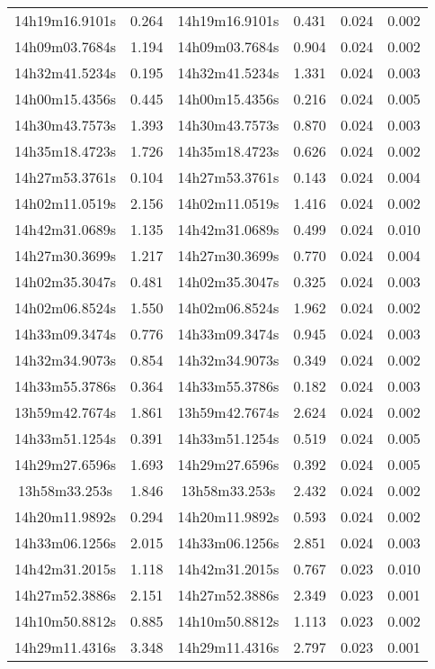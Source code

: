 \begin{table}
\begin{tabular}{cccccc}
14h19m16.9101s & 0.264 & 14h19m16.9101s & 0.431 & 0.024 & 0.002 \\
14h09m03.7684s & 1.194 & 14h09m03.7684s & 0.904 & 0.024 & 0.002 \\
14h32m41.5234s & 0.195 & 14h32m41.5234s & 1.331 & 0.024 & 0.003 \\
14h00m15.4356s & 0.445 & 14h00m15.4356s & 0.216 & 0.024 & 0.005 \\
14h30m43.7573s & 1.393 & 14h30m43.7573s & 0.870 & 0.024 & 0.003 \\
14h35m18.4723s & 1.726 & 14h35m18.4723s & 0.626 & 0.024 & 0.002 \\
14h27m53.3761s & 0.104 & 14h27m53.3761s & 0.143 & 0.024 & 0.004 \\
14h02m11.0519s & 2.156 & 14h02m11.0519s & 1.416 & 0.024 & 0.002 \\
14h42m31.0689s & 1.135 & 14h42m31.0689s & 0.499 & 0.024 & 0.010 \\
14h27m30.3699s & 1.217 & 14h27m30.3699s & 0.770 & 0.024 & 0.004 \\
14h02m35.3047s & 0.481 & 14h02m35.3047s & 0.325 & 0.024 & 0.003 \\
14h02m06.8524s & 1.550 & 14h02m06.8524s & 1.962 & 0.024 & 0.002 \\
14h33m09.3474s & 0.776 & 14h33m09.3474s & 0.945 & 0.024 & 0.003 \\
14h32m34.9073s & 0.854 & 14h32m34.9073s & 0.349 & 0.024 & 0.002 \\
14h33m55.3786s & 0.364 & 14h33m55.3786s & 0.182 & 0.024 & 0.003 \\
13h59m42.7674s & 1.861 & 13h59m42.7674s & 2.624 & 0.024 & 0.002 \\
14h33m51.1254s & 0.391 & 14h33m51.1254s & 0.519 & 0.024 & 0.005 \\
14h29m27.6596s & 1.693 & 14h29m27.6596s & 0.392 & 0.024 & 0.005 \\
13h58m33.253s & 1.846 & 13h58m33.253s & 2.432 & 0.024 & 0.002 \\
14h20m11.9892s & 0.294 & 14h20m11.9892s & 0.593 & 0.024 & 0.002 \\
14h33m06.1256s & 2.015 & 14h33m06.1256s & 2.851 & 0.024 & 0.003 \\
14h42m31.2015s & 1.118 & 14h42m31.2015s & 0.767 & 0.023 & 0.010 \\
14h27m52.3886s & 2.151 & 14h27m52.3886s & 2.349 & 0.023 & 0.001 \\
14h10m50.8812s & 0.885 & 14h10m50.8812s & 1.113 & 0.023 & 0.002 \\
14h29m11.4316s & 3.348 & 14h29m11.4316s & 2.797 & 0.023 & 0.001 \\

\end{tabular}
\end{table}
